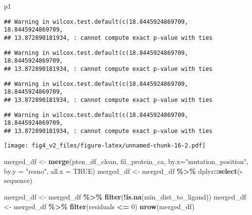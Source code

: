 \documentclass[
]{article}
\newenvironment{Shaded}{\begin{snugshade}}{\end{snugshade}}
\newcommand{\AttributeTok}[1]{\textcolor[rgb]{0.13,0.29,0.53}{#1}}
\newcommand{\ConstantTok}[1]{\textcolor[rgb]{0.56,0.35,0.01}{#1}}
\newcommand{\DecValTok}[1]{\textcolor[rgb]{0.00,0.00,0.81}{#1}}
\newcommand{\FunctionTok}[1]{\textcolor[rgb]{0.13,0.29,0.53}{\textbf{#1}}}
\newcommand{\NormalTok}[1]{#1}
\newcommand{\OtherTok}[1]{\textcolor[rgb]{0.56,0.35,0.01}{#1}}
\newcommand{\SpecialCharTok}[1]{\textcolor[rgb]{0.81,0.36,0.00}{\textbf{#1}}}
\newcommand{\StringTok}[1]{\textcolor[rgb]{0.31,0.60,0.02}{#1}}
\begin{document}
\begin{Shaded}
\begin{Highlighting}[]
\NormalTok{p1}
\end{Highlighting}
\end{Shaded}

\begin{verbatim}
## Warning in wilcox.test.default(c(18.8445924869709, 18.8445924869709,
## 13.872890181934, : cannot compute exact p-value with ties
\end{verbatim}

\begin{verbatim}
## Warning in wilcox.test.default(c(18.8445924869709, 18.8445924869709,
## 13.872890181934, : cannot compute exact p-value with ties
\end{verbatim}

\begin{verbatim}
## Warning in wilcox.test.default(c(18.8445924869709, 18.8445924869709,
## 13.872890181934, : cannot compute exact p-value with ties
\end{verbatim}

\begin{verbatim}
## Warning in wilcox.test.default(c(18.8445924869709, 18.8445924869709,
## 13.872890181934, : cannot compute exact p-value with ties
\end{verbatim}

\texttt{[image: fig4\_v2\_files/figure-latex/unnamed-chunk-16-2.pdf]}

\begin{Shaded}
\begin{Highlighting}[]
\NormalTok{merged\_df }\OtherTok{\textless{}{-}} \FunctionTok{merge}\NormalTok{(pten\_df\_clean, fil\_protein\_ca, }\AttributeTok{by.x=}\StringTok{"mutation\_position"}\NormalTok{, }\AttributeTok{by.y =} \StringTok{"resno"}\NormalTok{, }\AttributeTok{all.x =} \ConstantTok{TRUE}\NormalTok{)}
\NormalTok{merged\_df }\OtherTok{\textless{}{-}}\NormalTok{ merged\_df }\SpecialCharTok{\%\textgreater{}\%}\NormalTok{ dplyr}\SpecialCharTok{::}\FunctionTok{select}\NormalTok{(}\SpecialCharTok{{-}}\NormalTok{sequence)}

\NormalTok{merged\_df }\OtherTok{\textless{}{-}}\NormalTok{ merged\_df }\SpecialCharTok{\%\textgreater{}\%} \FunctionTok{filter}\NormalTok{(}\SpecialCharTok{!}\FunctionTok{is.na}\NormalTok{(min\_dist\_to\_ligand))}
\NormalTok{merged\_df }\OtherTok{\textless{}{-}}\NormalTok{ merged\_df }\SpecialCharTok{\%\textgreater{}\%} \FunctionTok{filter}\NormalTok{(residuals }\SpecialCharTok{\textless{}=} \DecValTok{0}\NormalTok{)}
\FunctionTok{nrow}\NormalTok{(merged\_df)}
\end{Highlighting}
\end{Shaded}
\end{document}
